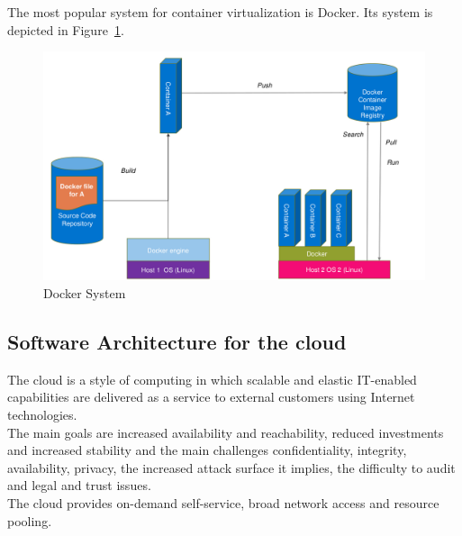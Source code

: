 The most popular system for container virtualization is Docker.
Its system is depicted in Figure~\ref{fig:docker}.
\begin{figure}[h]
  \centering
  \includegraphics[width=.8\textwidth]{images/docker.png}
  \caption{Docker System}\label{fig:docker}
\end{figure}

\subsection{Software Architecture for the cloud}
The cloud is a style of computing in which scalable and elastic IT-enabled capabilities are delivered as a service to external customers using Internet technologies.\\
The main goals are increased availability and reachability, reduced investments and increased stability and the main challenges confidentiality, integrity, availability, privacy, the increased attack surface it implies, the difficulty to audit and legal and trust issues.\\
The cloud provides on-demand self-service, broad network access and resource pooling.

